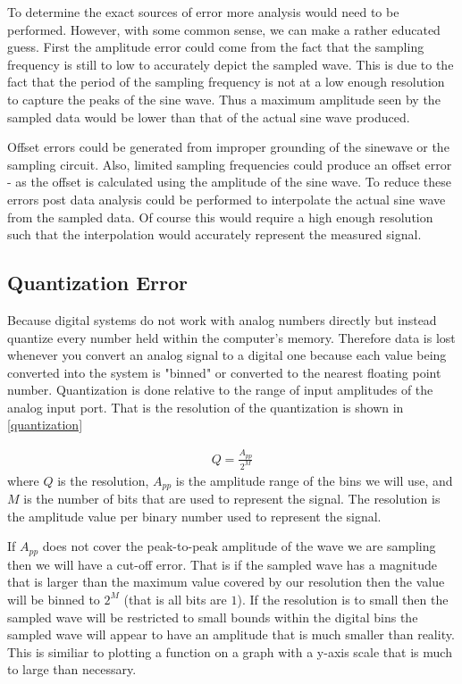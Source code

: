 \documentclass[main.tex]{subfile}
\begin{document}
To determine the exact sources of error more analysis would need to be
performed. However, with some common sense, we can make a rather educated guess.
First the amplitude error could come from the fact that the sampling frequency
is still to low to accurately depict the sampled wave. This is due to the fact
that the period of the sampling frequency is not at a low enough resolution to
capture the peaks of the sine wave. Thus a maximum amplitude seen by the sampled
data would be lower than that of the actual sine wave produced. 

Offset errors could be generated from improper grounding of the sinewave or the
sampling circuit. Also, limited sampling frequencies could produce an offset
error - as the offset is calculated using the amplitude of the sine wave. To
reduce these errors post data analysis could be performed to interpolate the
actual sine wave from the sampled data. Of course this would require a high
enough resolution such that the interpolation would accurately represent the
measured signal.

\subsection{Quantization Error}
\label{sec:quantization_error}

Because digital systems do not work with analog numbers directly but instead
quantize every number held within the computer's memory. Therefore data is lost
whenever you convert an analog signal to a digital one because each value being
converted into the system is "binned" or converted to the nearest floating point
number. Quantization is done relative to the range of input amplitudes of the
analog input port. That is the resolution of the quantization is shown in
\eqref{quantization}

\begin{align}
	Q = \frac{A_{pp}}{2^M}\label{quantization}
\end{align}
where $Q$ is the resolution, $A_{pp}$ is the amplitude range of the bins we will
use, and $M$ is the number of bits that are used to represent the signal. The
resolution is the amplitude value per binary number used to represent the
signal.

If $A_{pp}$ does not cover the peak-to-peak amplitude of the wave we are
sampling then we will have a cut-off error. That is if the sampled wave has a
magnitude that is larger than the maximum value covered by our resolution then
the value will be binned to $2^M$ (that is all bits are $1$). If the resolution
is to small then the sampled wave will be restricted to small bounds within the
digital bins the sampled wave will appear to have an amplitude that is much
smaller than reality. This is similiar to plotting a function on a graph with a
y-axis scale that is much to large than necessary.
\end{document}
